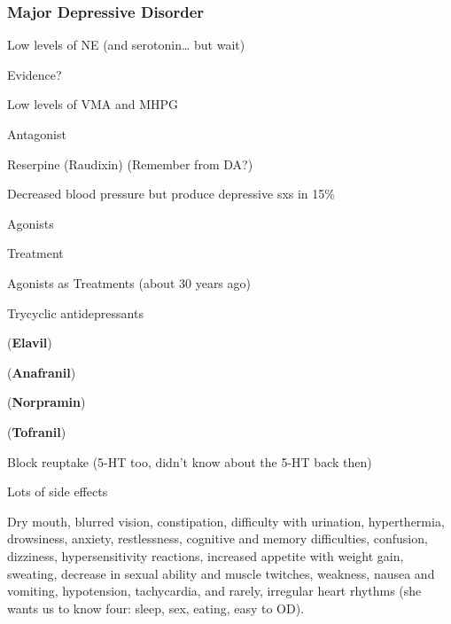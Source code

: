 \subsubsection{Major Depressive Disorder}

\begin{coloredlist}
    \item Low levels of NE (and serotonin… but wait)
    \begin{coloredlist}
        \item Evidence?
        \begin{coloredlist}
            \item Low levels of VMA and MHPG
            \item Antagonist
            \begin{coloredlist}
                \item Reserpine (Raudixin) (Remember from DA?)
                \item Decreased blood pressure but produce depressive sxs in 15\%
            \end{coloredlist}
            \item Agonists
            \begin{coloredlist}
                \item Treatment
            \end{coloredlist}
        \end{coloredlist}
    \end{coloredlist}
    \item Agonists as Treatments (about 30 years ago)
    \begin{coloredlist}
        \item Trycyclic antidepressants
        \begin{multicols}{2}
            \item {} (\textbf{Elavil})
            \item {} (\textbf{Anafranil})
            \item {} (\textbf{Norpramin})
            \item {} (\textbf{Tofranil})
        \end{multicols}
        \item Block reuptake (5-HT too, didn’t know about the 5-HT back then)
        \item Lots of side effects
        \begin{coloredlist}
            \item Dry mouth, blurred vision, constipation, difficulty with urination, hyperthermia, drowsiness, anxiety, restlessness, cognitive and memory difficulties, confusion, dizziness, hypersensitivity reactions, increased appetite with weight gain, sweating, decrease in sexual ability and muscle twitches, weakness, nausea and vomiting, hypotension, tachycardia, and rarely, irregular heart rhythms (she wants us to know four: sleep, sex, eating, easy to OD).

\end{coloredlist}
\end{coloredlist}
\end{coloredlist}
